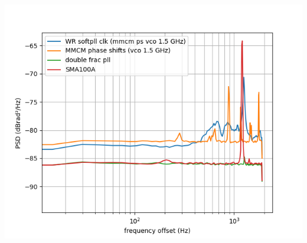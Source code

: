 \documentclass[compress,10pt,aspectratio=169]{beamer}
\begin{document}
\begin{frame}[fragile]
\begin{minipage}[t]{1.06\linewidth}
\begin{minipage}{.49\linewidth}
\includegraphics[width=1.05\linewidth]{dmtd_phase_noise_by_clk_src.png}
\end{minipage}
\end{minipage}
\end{frame}
\end{document}
